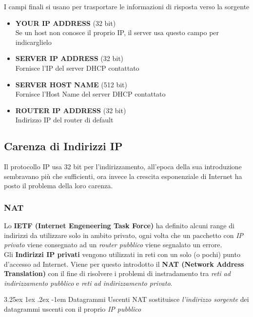 \documentclass{article}
\makeatletter
\renewcommand\paragraph{\@startsection{paragraph}{5}{\z@}%
  {3.25ex \@plus1ex \@minus.2ex}%
  {-1em}%
  {\normalfont\normalsize\bfseries}}
\makeatother
\begin{document}
                I campi finali si usano per trasportare le informazioni di risposta verso la sorgente
                \begin{itemize}
                    \item \textbf{YOUR IP ADDRESS} (32 bit)\\
                          Se un host non conosce il proprio IP, il server usa questo campo per indicarglielo
                    \item \textbf{SERVER IP ADDRESS} (32 bit)\\
                          Fornisce l'IP del server DHCP contattato
                    \item \textbf{SERVER HOST NAME} (512 bit)\\
                          Fornisce l'Host Name del server DHCP contattato
                    \item \textbf{ROUTER IP ADDRESS} (32 bit)\\
                          Indirizzo IP del router di default
                \end{itemize}

        \subsection{Carenza di Indirizzi IP}
            Il protocollo IP usa 32 bit per l'indirizzamento, all'epoca della sua introduzione sembravano più che sufficienti, ora invece la crescita esponenziale di Internet ha posto il problema della loro carenza.

            \subsubsection{NAT}
                Lo \textbf{IETF (Internet Engeneering Task Force)} ha definito alcuni range di indirizzi da utilizzare solo in ambito privato, ogni volta che un pacchetto con \textit{IP privato} viene consegnato ad un \textit{router pubblico} viene segnalato un errore.\\
                Gli \textbf{Indirizzi IP privati} vengono utilizzati in reti con un solo (o pochi) punto d'accesso ad Internet. Viene per questo introdotto il \textbf{NAT (Network Address Translation)} con il fine di risolvere i problemi di instradamento tra \textit{reti ad indirizzamento pubblico} e \textit{reti ad indirizzamento privato}.

                \paragraph{Datagrammi Uscenti}
                    NAT sostituisce \textit{l'indirizzo sorgente} dei datagrammi uscenti con il proprio \textit{IP pubblico}
\end{document}
